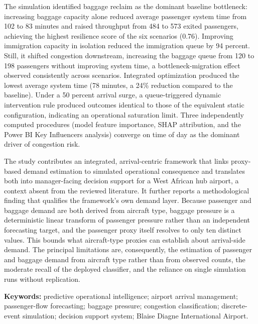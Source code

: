 The simulation identified baggage reclaim as the dominant baseline bottleneck: increasing baggage capacity alone reduced average passenger system time from 102 to 83 minutes and raised throughput from 484 to 573 exited passengers, achieving the highest resilience score of the six scenarios (0.76). Improving immigration capacity in isolation reduced the immigration queue by 94 percent. Still, it shifted congestion downstream, increasing the baggage queue from 120 to 198 passengers without improving system time, a bottleneck-migration effect observed consistently across scenarios. Integrated optimization produced the lowest average system time (78 minutes, a 24\% reduction compared to the baseline). Under a 50 percent arrival surge, a queue-triggered dynamic intervention rule produced outcomes identical to those of the equivalent static configuration, indicating an operational saturation limit. Three independently computed procedures (model feature importance, SHAP attribution, and the Power BI Key Influencers analysis) converge on time of day as the dominant driver of congestion risk.

The study contributes an integrated, arrival-centric framework that links proxy-based demand estimation to simulated operational consequence and translates both into manager-facing decision support for a West African hub airport, a context absent from the reviewed literature. It further reports a methodological finding that qualifies the framework's own demand layer. Because passenger and baggage demand are both derived from aircraft type, baggage pressure is a deterministic linear transform of passenger pressure rather than an independent forecasting target, and the passenger proxy itself resolves to only ten distinct values. This bounds what aircraft-type proxies can establish about arrival-side demand. The principal limitations are, consequently, the estimation of passenger and baggage demand from aircraft type rather than from observed counts, the moderate recall of the deployed classifier, and the reliance on single simulation runs without replication.

\vspace{1em}

\noindent\textbf{Keywords:} predictive operational intelligence; airport arrival management; passenger-flow forecasting; baggage pressure; congestion classification; discrete-event simulation; decision support system; Blaise Diagne International Airport.